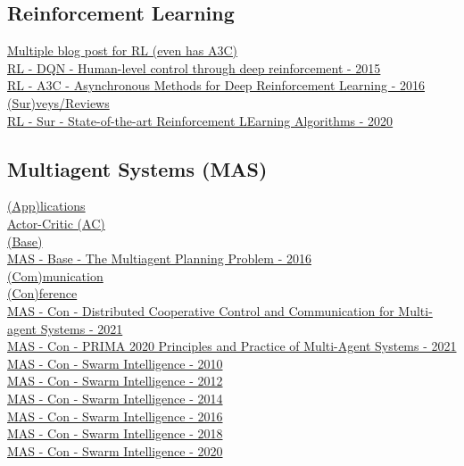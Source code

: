 \subsection{Reinforcement Learning}
\href{https://medium.com/emergent-future/simple-reinforcement-learning-with-tensorflow-part-0-q-learning-with-tables-and-neural-networks-d195264329d0}{Multiple blog post for RL (even has A3C)}
\\
\href{https://www.nature.com/articles/nature14236}{RL - DQN - Human-level control through deep reinforcement - 2015}
\\
\href{http://proceedings.mlr.press/v48/mniha16.html}{RL - A3C - Asynchronous Methods for Deep Reinforcement Learning - 2016}
\\
\underline{(Sur)veys/Reviews}
\\
\href{https://www.researchgate.net/publication/338396174_State-of-the-Art_Reinforcement_Learning_Algorithms}{RL - Sur - State-of-the-art Reinforcement LEarning Algorithms - 2020}

\subsection{Multiagent Systems (MAS)}
\underline{(App)lications}
\\

\underline{Actor-Critic (AC)}
\\

\underline{(Base)}
\\
\href{https://www.hindawi.com/journals/complexity/2017/3813912/}{MAS - Base - The Multiagent Planning Problem - 2016}
\\

\underline{(Com)munication}
\\

\underline{(Con)ference}
\\
\href{https://link.springer.com/book/10.1007%2F978-981-33-6718-0}{MAS - Con - Distributed Cooperative Control and Communication for Multi-agent Systems - 2021}
\\
\href{https://link.springer.com/book/10.1007%2F978-3-030-69322-0}{MAS - Con - PRIMA 2020 Principles and Practice of Multi-Agent Systems - 2021}
\\
\href{https://link.springer.com/book/10.1007/978-3-642-15461-4}{MAS - Con - Swarm Intelligence - 2010}
\\
\href{https://link.springer.com/book/10.1007/978-3-642-32650-9}{MAS - Con - Swarm Intelligence - 2012}
\\
\href{https://link.springer.com/book/10.1007/978-3-319-09952-1}{MAS - Con - Swarm Intelligence - 2014}
\\
\href{https://link.springer.com/book/10.1007/978-3-319-44427-7}{MAS - Con - Swarm Intelligence - 2016}
\\
\href{https://link.springer.com/book/10.1007/978-3-030-00533-7}{MAS - Con - Swarm Intelligence - 2018}
\\
\href{https://link.springer.com/book/10.1007/978-3-030-60376-2}{MAS - Con - Swarm Intelligence - 2020}
\\

